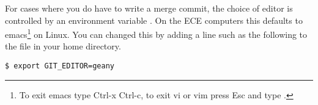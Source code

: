 For cases where you do have to write a merge commit, the choice of
editor is controlled by an environment variable
. On the ECE computers this defaults to
emacs\footnote{To exit emacs type Ctrl-x Ctrl-c, to exit vi or vim
press Esc and type
.}  on Linux. You can changed this by adding a line such as
the following to the  file in your home
directory.

\begin{verbatim}
$ export GIT_EDITOR=geany
\end{verbatim}
